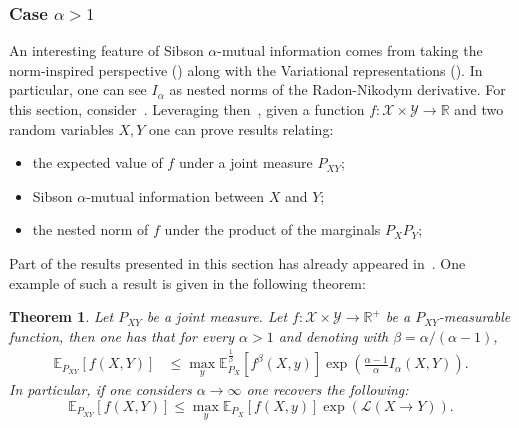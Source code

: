 \documentclass{article}
\newtheorem{theorem}{Theorem}
\numberwithin{theorem}{section}
\numberwithin{example}{section}
\numberwithin{remark}{section}
\numberwithin{definition}{section}
\newcommand{\X}{\mathcal{X}}
\newcommand{\Y}{\mathcal{Y}}
\newcommand{\ml}[2]{\mathcal{L}\left(#1  \!\!  \to  \!\!   #2\right)} %
\begin{document}
\subsubsection{Case $\alpha>1$}\label{sec:depVsIndepPos}
An interesting feature of Sibson $\alpha$-mutual information comes from taking the norm-inspired perspective () along with the Variational representations (). In particular, one can see $I_\alpha$ as nested norms of the Radon-Nikodym derivative. For this section, consider~. Leveraging then~, given a function $f:\X\times\Y \to \mathbb{R}$ and two random variables $X,Y$ one can prove results relating: 
\begin{itemize}
    \item the expected value of $f$ under a joint measure $P_{XY}$;
    \item Sibson $\alpha$-mutual information between $X$ and $Y$;
    \item the nested norm of $f$ under the product of the marginals $P_X P_Y$;
\end{itemize} 
Part of the results presented in this section has already appeared in~\cite{EspositoGI:2021}.
One example of such a result is given in the following theorem:
\begin{theorem}\label{thm:upperBoundExpSibson}
    Let $P_{XY}$ be a joint measure. Let $f:\X\times\Y\to\mathbb{R}^+$ be a $P_{XY}$-measurable function, then one has that for every $\alpha>1$ and denoting with $\beta=\alpha/(\alpha-1)$,
    \begin{equation}
    \begin{split}
        \mathbb{E}_{P_{XY}}\left[f(X,Y)\right] &\leq \max_y \mathbb{E}^\frac1\beta_{P_{X}}\left[f^\beta(X,y)\right]\exp\left(\frac{\alpha-1}{\alpha}I_\alpha(X,Y)\right).
    \end{split}
    \end{equation}
    In particular, if one considers $\alpha\to\infty$ one recovers the following:
       \begin{equation}
        \mathbb{E}_{P_{XY}}\left[f(X,Y)\right] \leq \max_y \mathbb{E}_{P_{X}}\left[f(X,y)\right]\exp\left(\ml{X}{Y}\right).
    \end{equation}
\end{theorem}
\end{document}
